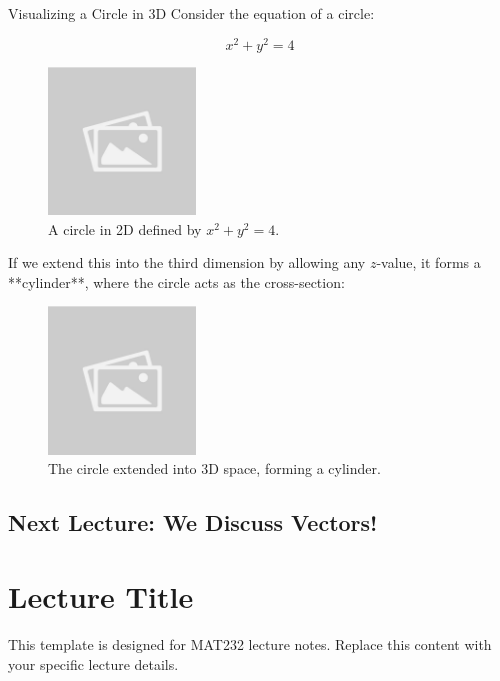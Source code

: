 \documentclass{article}
\begin{document}
\begin{examplebox}{Visualizing a Circle in 3D}
Consider the equation of a circle:

\[
    x^2 + y^2 = 4
\]

\begin{figure}[H]
    \centering
    \includegraphics[width=0.35\textwidth]{sample_image.jpg}
    \caption{A circle in 2D defined by \( x^2 + y^2 = 4 \).}
    \label{fig:circle_2d}
\end{figure}

If we extend this into the third dimension by allowing any \( z \)-value, it forms a **cylinder**, where the circle acts as the cross-section:

\begin{figure}[H]
    \centering
    \includegraphics[width=0.35\textwidth]{sample_image.jpg}
    \caption{The circle extended into 3D space, forming a cylinder.}
    \label{fig:cylinder_3d}
\end{figure}

\end{examplebox}

\subsection*{Next Lecture: We Discuss Vectors!}

\section*{Lecture Title}
\begin{notebox}
This template is designed for MAT232 lecture notes. Replace this content with your specific lecture details.
\end{notebox}
\end{document}
